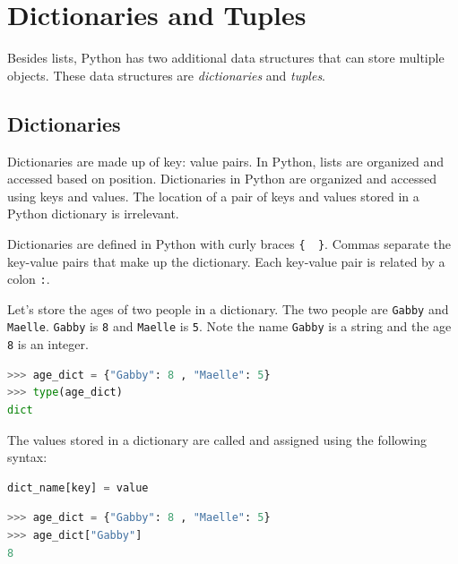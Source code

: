 \documentclass{book}
\begin{document}
    
        \section{Dictionaries and Tuples}\label{dictionaries-and-tuples}
    




    
        Besides lists, Python has two additional data structures that can store
multiple objects. These data structures are \emph{dictionaries} and
\emph{tuples}.
    




    
        \subsection{Dictionaries}\label{dictionaries}
    




    
        Dictionaries are made up of key: value pairs. In Python, lists are
organized and accessed based on position. Dictionaries in Python are
organized and accessed using keys and values. The location of a pair of
keys and values stored in a Python dictionary is irrelevant.

Dictionaries are defined in Python with curly braces \lstinline!{  }!.
Commas separate the key-value pairs that make up the dictionary. Each
key-value pair is related by a colon \lstinline!:!.

Let's store the ages of two people in a dictionary. The two people are
\lstinline!Gabby! and \lstinline!Maelle!. \lstinline!Gabby! is
\lstinline!8! and \lstinline!Maelle! is \lstinline!5!. Note the name
\lstinline!Gabby! is a string and the age \lstinline!8! is an integer.

\begin{lstlisting}[language=Python]
>>> age_dict = {"Gabby": 8 , "Maelle": 5}
>>> type(age_dict)
dict
\end{lstlisting}

The values stored in a dictionary are called and assigned using the
following syntax:

\begin{lstlisting}[language=Python]
dict_name[key] = value
\end{lstlisting}

\begin{lstlisting}[language=Python]
>>> age_dict = {"Gabby": 8 , "Maelle": 5}
>>> age_dict["Gabby"]
8
\end{lstlisting}
\end{document}
